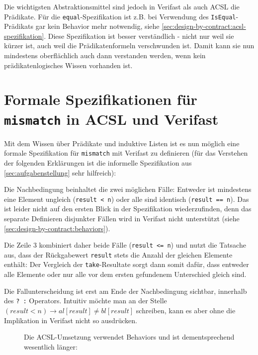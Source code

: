 Die wichtigsten Abstraktionsmittel sind jedoch in Verifast als auch ACSL die Prädikate. 
Für die \texttt{equal}-Spezifikation ist z.B. bei Verwendung des \texttt{IsEqual}-Prädikats gar 
kein Behavior mehr notwendig, siehe \ref{sec:design-by-contract:acsl-spezifikation}. Diese Spezifikation 
ist besser verständlich - nicht nur weil sie kürzer ist, auch weil die Prädikatenformeln verschwunden ist. 
Damit kann sie nun mindestens oberflächlich auch dann verstanden werden, wenn kein 
prädikatenlogisches Wissen vorhanden ist.



\section{Formale Spezifikationen für \texttt{mismatch} in ACSL und Verifast}

Mit dem Wissen über Prädikate und induktive Listen ist es nun möglich eine formale Spezifikation für \lstinline{mismatch} mit Verifast
zu definieren (für das Verstehen der folgenden Erklärungen ist die informelle Spezifikation aus 
\ref{sec:aufgabenstellung} sehr hilfreich):



Die Nachbedingung beinhaltet die zwei möglichen Fälle: Entweder ist mindestens eine Element ungleich
(\lstinline{result < n}) oder alle sind identisch (\lstinline{result == n}). Das ist leider nicht auf den
ersten Blick in der Spezifikation wiederzufinden, denn das separate Definieren disjunkter Fällen wird in Verifast 
nicht unterstützt (siehe \ref{sec:design-by-contract:behaviors}). 

Die Zeile 3 kombiniert daher beide Fälle (\lstinline{result <= n}) und nutzt die Tatsache aus, dass
der Rückgabewert \lstinline{result} stets die Anzahl der gleichen Elemente enthält: Der Vergleich der
\lstinline{take}-Resultate sorgt dann somit dafür, dass entweder alle Elemente oder nur
alle vor dem ersten gefundenem Unterschied gleich sind. 

Die Fallunterscheidung ist erst am Ende der Nachbedingung sichtbar, innerhalb des \lstinline{? :} Operators.
Intuitiv möchte man an der Stelle \((result < n) \rightarrow al[result] \neq  bl[result]\)
schreiben, kann es aber ohne die Implikation in Verifast nicht so ausdrücken.

\begin{figure}[H]
Die ACSL-Umsetzung verwendet Behaviors und ist dementsprechend wesentlich länger:

\end{figure}

